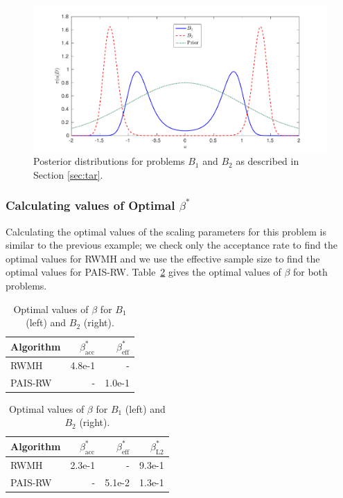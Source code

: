 \documentclass[final]{siamltex}
\begin{document}
\begin{figure}[htpb]
\begin{center}
\includegraphics[width=\textwidth]{"figures/posteriors3"}
\caption{Posterior distributions for problems $B_1$ and $B_2$ as
  described in Section \ref{sec:tar}.}
\label{fig:problem 3 posteriors}
\end{center}
\end{figure}

\subsubsection{Calculating values of Optimal $\beta^*$}\label{sec:BM1_opt_beta}

Calculating the optimal values of the scaling parameters for this
problem is similar to the previous example; we check only the acceptance rate to find the optimal values for RWMH and we use the effective sample size to find the optimal values for PAIS-RW. Table~\ref{table:BM_opt_beta} gives the optimal values of $\beta$ for both problems.

\begin{table}[!htb]
    \begin{minipage}{.5\linewidth}
      \centering
        \begin{tabular}{|l|r|r|}
	\hline
	Algorithm							& $\beta^*_{\text{acc}}$	& $\beta^*_{\text{eff}}$ \\ \hline
	RWMH								& 4.8e-1					& - \\
	PAIS-RW								& -						& 1.0e-1\\
	\hline
	\end{tabular}
    \end{minipage}%
    \begin{minipage}{.5\linewidth}
      \centering
        \begin{tabular}{|l|r|r|r|}
	\hline
	Algorithm							& $\beta^*_{\text{acc}}$	& $\beta^*_{\text{eff}}$	& $\beta^*_{\text{L2}}$ \\ \hline
	RWMH								& 2.3e-1					& - 						& 9.3e-1\\
	PAIS-RW								& -						& 5.1e-2 					& 1.3e-1\\
	\hline
	\end{tabular}
    \end{minipage}
	\vspace{1mm}
	\caption{Optimal values of $\beta$ for $B_1$ (left) and $B_2$ (right).}
	\label{table:BM_opt_beta}
\end{table}
\end{document}
